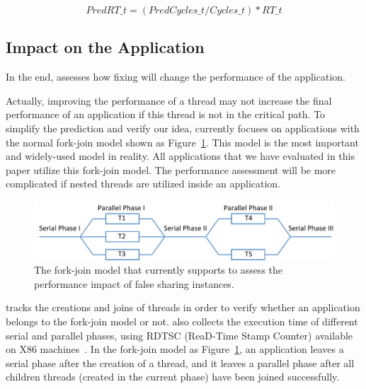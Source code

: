 \begin{equation}
\label{eq:predictedrtofthread}
 PredRT\_{t} = (PredCycles\_{t} / Cycles\_{t}) * RT\_{t} 
\end{equation} 

\subsection{Impact on the Application}
\label{sec:impactapp}

In the end, \cheetah{} assesses how fixing will change the performance of the application. 

Actually, improving the performance of a thread may not increase the final performance of an application if this thread is not in the critical path.  To simplify the prediction and verify our idea, \cheetah{} currently focuses on applications with the normal fork-join model shown as Figure~\ref{fig:forkjoinmodel}. This model is the most important and widely-used model in reality. All applications that we have evaluated in this paper utilize this fork-join model. The performance assessment will be more complicated if nested threads are utilized inside an application. 


\begin{figure}[ht!]
\begin{center}
\includegraphics[width=6in]{figure/forkjoin}
\end{center}
\caption{The fork-join model that \Cheetah{} currently supports to assess the performance impact of false sharing instances. }
\label{fig:forkjoinmodel}
\end{figure}

\cheetah{} tracks the creations and joins of threads in order to verify whether an application belongs to the fork-join model or not. \Cheetah{} also collects the execution time of different serial and parallel phases, using RDTSC (ReaD-Time Stamp Counter) available on X86 machines~\cite{rtdsc}. In the fork-join model as Figure~\ref{fig:forkjoinmodel}, an application leaves a serial phase after the creation of a thread, and it leaves a parallel phase after all children threads (created in the current phase) have been joined successfully. 

